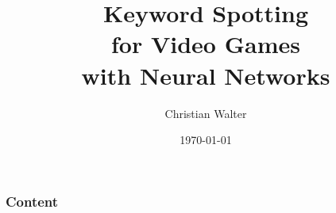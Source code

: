 \documentclass{beamer}
\title[Keyword Spotting for Video Games with Neural Networks]{Keyword Spotting\\for Video Games\\with Neural Networks}
\author{Christian Walter}
\date{\today}
\begin{document}
\titleframe

\begin{frame}
  \frametitle{Content}
  \tableofcontents
\end{frame}











\end{document}
